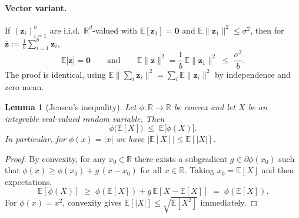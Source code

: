 \documentclass[twoside]{article}
\theoremstyle{plain}
\newtheorem{lemma}{Lemma}[section]
\theoremstyle{definition}
\theoremstyle{remark}
\def\vzero{{\bm{0}}}
\def\vz{{\bm{z}}}
\newcommand{\E}{\mathbb{E}}
\newcommand{\R}{\mathbb{R}}
\begin{document}
\paragraph{Vector variant.}
If $(\vz_i)_{i=1}^b$ are i.i.d.\ $\R^d$-valued with $\E[\vz_1]=\vzero$ and
$\E\|\vz_1\|^2\le \sigma^2$, then for $\overline{\vz} := \tfrac{1}{b}\sum_{i=1}^b \vz_i$,
\[
  \E\big[\overline{\vz}\big]=\vzero
  \qquad\text{and}\qquad
  \E\|\overline{\vz}\|^2
  = \frac{1}{b}\,\E\|\vz_1\|^2 \;\le\; \frac{\sigma^2}{b}.
\]
The proof is identical, using $\E\|\sum_i \vz_i\|^2 = \sum_i \E\|\vz_i\|^2$
by independence and zero mean.

\medskip
\begin{propbox}
\begin{lemma}[Jensen's inequality]
\label{lem:jensen}
Let $\phi:\R\to\R$ be convex and let $X$ be an integrable real-valued random
variable. Then
\[
    \phi\big(\E[X]\big) \;\le\; \E\big[\phi(X)\big].
\]
In particular, for $\phi(x)=|x|$ we have $|\E[X]|\le \E[|X|]$.
\end{lemma}
\end{propbox}
\begin{proof}
By convexity, for any $x_0\in\R$ there exists a subgradient $g\in\partial\phi(x_0)$
such that $\phi(x)\ge \phi(x_0) + g\,(x-x_0)$ for all $x\in\R$. Taking $x_0=\E[X]$
and then expectations,
\[
  \E[\phi(X)] \;\ge\; \phi(\E[X]) + g\,\E[X-\E[X]] \;=\; \phi(\E[X]).
\]
For $\phi(x)=x^2$, convexity gives $\E[|X|]\le \sqrt{\E[X^2]}$ immediately.
\end{proof}
\end{document}
